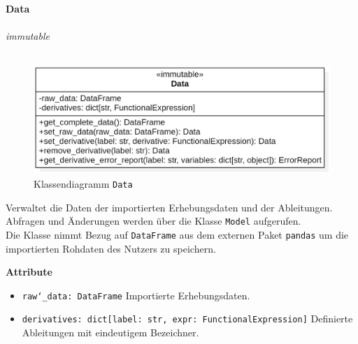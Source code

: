 \documentclass{article}
\begin{document}
\newpage
\textbf{\large{Data}}\\\\
\textit{\flqq{}immutable\frqq}\normalsize\\\\
\begin{figure}[H]%
    \centering
    \includegraphics[width=13cm]{entwurf/Entwurf_dokument/img/cls/model/Data.png}
    \caption{Klassendiagramm \texttt{Data}}
\end{figure}

Verwaltet die Daten der importierten Erhebungsdaten und der Ableitungen. Abfragen und Änderungen werden über die Klasse \texttt{Model} aufgerufen.\\
Die Klasse nimmt Bezug auf \texttt{DataFrame} aus dem externen Paket \texttt{pandas} um die importierten Rohdaten des Nutzers zu speichern.
\newline \newline

\textbf{{Attribute}}
\begin{itemize}
\item \texttt{raw\char`_data: DataFrame} \newline Importierte Erhebungsdaten.
\item \texttt{derivatives: dict[label: str, expr: FunctionalExpression]} \newline Definierte Ableitungen mit eindeutigem Bezeichner.
\\\\
\end{itemize}
\end{document}
